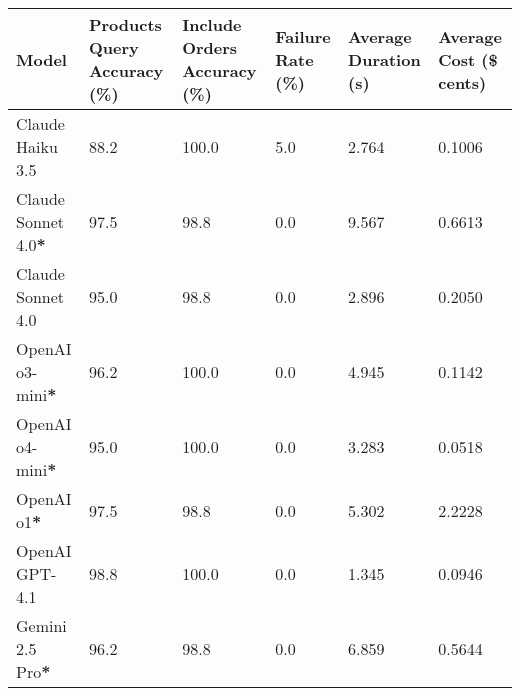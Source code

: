 \begin{table}[H]
    \centering
    \footnotesize
    \begin{tabularx}{\textwidth}{Xp{2.5cm}p{2.2cm}p{1.5cm}p{1.8cm}p{2cm}}
        \toprule
        Model                       & Products Query \newline Accuracy (\%) & Include Orders \newline Accuracy (\%) & Failure \newline Rate (\%) & Average \newline Duration (s) & Average \newline Cost (\$ cents) \\
        \midrule
        \rowcolor[gray]{0.9}
        Claude Haiku 3.5            & 88.2                                  & 100.0                                 & 5.0                        & 2.764                         & 0.1006                           \\
        Claude Sonnet 4.0\textbf{*} & 97.5                                  & 98.8                                  & 0.0                        & 9.567                         & 0.6613                           \\
        \rowcolor[gray]{0.9}
        Claude Sonnet 4.0           & 95.0                                  & 98.8                                  & 0.0                        & 2.896                         & 0.2050                           \\
        OpenAI o3-mini\textbf{*}    & 96.2                                  & 100.0                                 & 0.0                        & 4.945                         & 0.1142                           \\
        \rowcolor[gray]{0.9}
        OpenAI o4-mini\textbf{*}    & 95.0                                  & 100.0                                 & 0.0                        & 3.283                         & 0.0518                           \\
        OpenAI o1\textbf{*}         & 97.5                                  & 98.8                                  & 0.0                        & 5.302                         & 2.2228                           \\
        \rowcolor[gray]{0.9}
        OpenAI GPT-4.1              & 98.8                                  & 100.0                                 & 0.0                        & 1.345                         & 0.0946                           \\
        Gemini 2.5 Pro\textbf{*}    & 96.2                                  & 98.8                                  & 0.0                        & 6.859                         & 0.5644                           \\

\end{tabularx}
\end{table}
